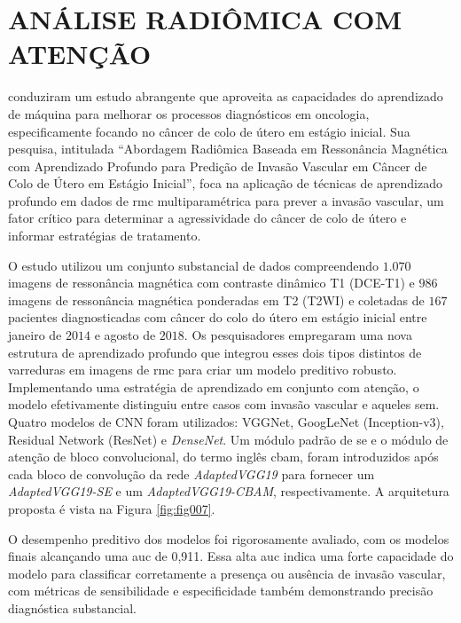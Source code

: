 \section{ANÁLISE RADIÔMICA COM ATENÇÃO}
\label{sec:analise_radiomica_com_atencao}

 conduziram um estudo abrangente que aproveita as capacidades do aprendizado de máquina para melhorar os processos diagnósticos em oncologia, especificamente focando no câncer de colo de útero em estágio inicial. Sua pesquisa, intitulada ``Abordagem Radiômica Baseada em Ressonância Magnética com Aprendizado Profundo para Predição de Invasão Vascular em Câncer de Colo de Útero em Estágio Inicial'', foca na aplicação de técnicas de aprendizado profundo em dados de \gls{rmc} multiparamétrica para prever a invasão vascular, um fator crítico para determinar a agressividade do câncer de colo de útero e informar estratégias de tratamento.

O estudo utilizou um conjunto substancial de dados compreendendo $1.070$ imagens de ressonância magnética com contraste dinâmico T1 (DCE-T1) e $986$ imagens de ressonância magnética ponderadas em T2 (T2WI) e coletadas de $167$ pacientes diagnosticadas com câncer do colo do útero em estágio inicial entre janeiro de $2014$ e agosto de $2018$. Os pesquisadores empregaram uma nova estrutura de aprendizado profundo que integrou esses dois tipos distintos de varreduras em imagens de \gls{rmc} para criar um modelo preditivo robusto. Implementando uma estratégia de aprendizado em conjunto com atenção, o modelo efetivamente distinguiu entre casos com invasão vascular e aqueles sem. Quatro modelos de CNN foram utilizados: VGGNet, GoogLeNet (Inception-v3), Residual Network (ResNet) e \textit{DenseNet}. Um módulo padrão de \gls{se}  e o módulo de atenção de bloco convolucional, do termo inglês \gls{cbam},  foram introduzidos após cada bloco de convolução da rede \textit{AdaptedVGG19} para fornecer um \textit{AdaptedVGG19-SE} e um \textit{AdaptedVGG19-CBAM}, respectivamente. A arquitetura proposta é vista na Figura \ref{fig:fig007}.

O desempenho preditivo dos modelos foi rigorosamente avaliado, com os modelos finais alcançando uma \gls{auc} de 0,911. Essa alta \gls{auc} indica uma forte capacidade do modelo para classificar corretamente a presença ou ausência de invasão vascular, com métricas de sensibilidade e especificidade também demonstrando precisão diagnóstica substancial.

